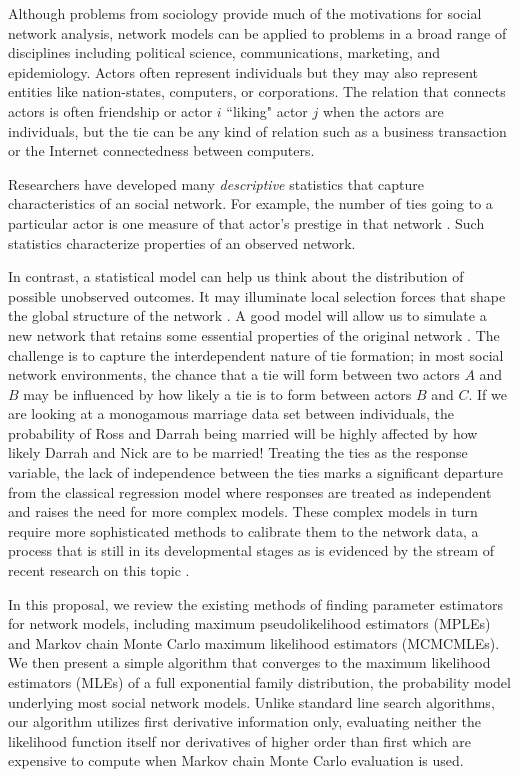   Although problems from sociology provide much of the motivations for social network analysis, network models can be applied to problems in a broad range of disciplines including political science, communications, marketing, and epidemiology.  Actors often represent individuals but they may also represent entities like nation-states, computers, or corporations.  The relation that connects actors is often friendship or actor $i$ ``liking" actor $j$ when the actors are individuals, but the tie can be any kind of relation such as a business transaction or the Internet connectedness between computers.  

Researchers have developed many \textit{descriptive} statistics that capture characteristics of an social network.  For example, the number of ties going to a particular actor is one measure of that actor's prestige in that network \citep{Wasserman:1994}.  Such statistics characterize properties of an observed network.  

In contrast, a statistical model can help us think about the distribution of possible unobserved outcomes.  It may illuminate local selection forces that shape the global structure of the network \citep{introp*, ergm}.  A good model will allow us to simulate a new network that retains some essential properties of the original network \citep{statnet}.  The challenge is to capture the interdependent nature of tie formation; in most social network environments, the chance that a tie will form between two actors $A$ and $B$ may be influenced by how likely a tie is to form between actors $B$ and $C$.  If we are looking at a monogamous marriage data set between individuals, the probability of Ross and Darrah being married will be highly affected by how likely Darrah and Nick are to be married!  Treating the ties as the response variable, the lack of independence between the ties marks a significant departure from the classical regression model where responses are treated as independent and raises the need for more complex models.  These complex models in turn require more sophisticated methods to calibrate them to the network data, a process that is still in its developmental stages as is evidenced by the stream of recent research on this topic \citep{Hunter:2006, Handcock:2006, recentp*, Morris:2008, Duijn:2009}.

In this proposal, we review the existing methods of finding parameter estimators for network models, including maximum pseudolikelihood estimators (MPLEs) and Markov chain Monte Carlo maximum likelihood estimators (MCMCMLEs).  We then present a simple algorithm that converges to the maximum likelihood estimators (MLEs) of a full exponential family distribution, the probability model underlying most social network models.  Unlike standard line search algorithms, our algorithm utilizes first derivative information only, evaluating neither the likelihood function itself nor derivatives of higher order than first which are expensive to compute when Markov chain Monte Carlo evaluation is used.


